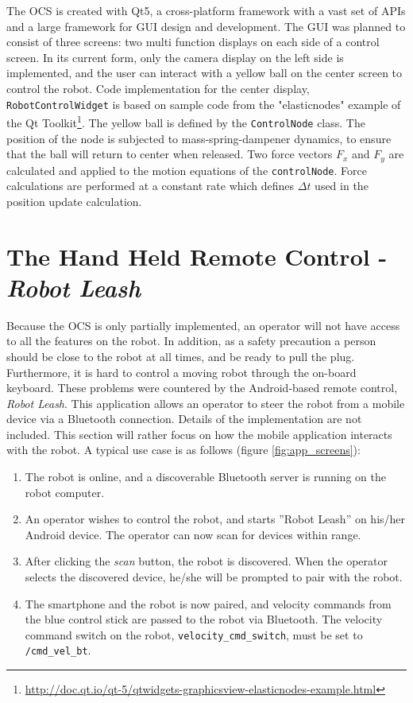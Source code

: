 The \ac{OCS} is created with Qt5, a cross-platform framework with a vast set of APIs and a large framework for \ac{GUI} design and development. The \ac{GUI} was planned to consist of three screens: two multi function displays on each side of a control screen. In its current form, only the camera display on the left side is implemented, and the user can interact with a yellow ball on the center screen to control the robot. Code implementation for the center display, \texttt{RobotControlWidget} is based on sample code from the "elasticnodes" example of the Qt Toolkit\footnote{\url{http://doc.qt.io/qt-5/qtwidgets-graphicsview-elasticnodes-example.html}}. The yellow ball is defined by the \texttt{ControlNode} class. The position of the node is subjected to mass-spring-dampener dynamics, to ensure that the ball will return to center when released. Two force vectors $F_x$ and $F_y$ are calculated and applied to the motion equations of the \texttt{controlNode}. Force calculations are performed at a constant rate which defines $\Delta t$ used in the position update calculation.  


\section{The Hand Held Remote Control - \textit{Robot Leash}}

Because the \ac{OCS} is only partially implemented, an operator will not have access to all the features on the robot. In addition, as a safety precaution a person should be close to the robot at all times, and be ready to pull the plug. Furthermore, it is hard to control a moving robot through the on-board keyboard. These problems were countered by the Android-based remote control, \textit{Robot Leash}. This application allows an operator to steer the robot from a mobile device via a Bluetooth connection. Details of the implementation are not included. This section will rather focus on how the mobile application interacts with the robot. A typical use case is as follows (figure \ref{fig:app_screens}):

\begin{enumerate}
	\item The robot is online, and a discoverable Bluetooth server is running on the robot computer.
	\item An operator wishes to control the robot, and starts ''Robot Leash'' on his/her Android device. The operator can now scan for devices within range.
	\item After clicking the \textit{scan} button, the robot is discovered. When the operator selects the discovered device, he/she will be prompted to pair with the robot.
	\item The smartphone and the robot is now paired, and velocity commands from the blue control stick are passed to the robot via Bluetooth. The velocity command switch on the robot, \texttt{velocity\_cmd\_switch}, must be set to \texttt{/cmd\_vel\_bt}.
\end{enumerate}

